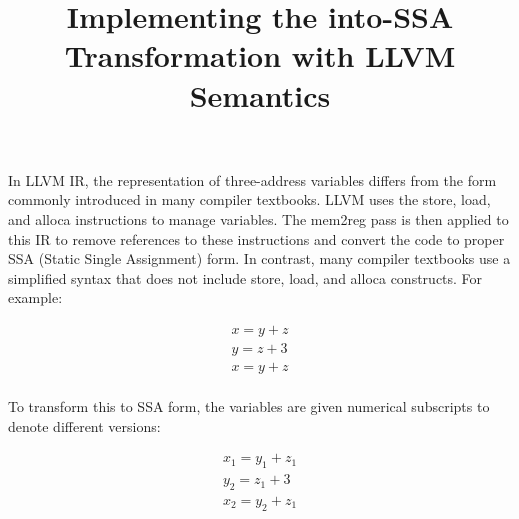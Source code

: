 \documentclass{article}
\title{Implementing the into-SSA Transformation with LLVM Semantics}
\author{}
\date{}
\begin{document}
\maketitle

In LLVM IR, the representation of three-address variables differs from the form
commonly introduced in many compiler textbooks. LLVM uses the store, load, and
alloca instructions to manage variables. The mem2reg pass is then applied to
this IR to remove references to these instructions and convert the code to
proper SSA (Static Single Assignment) form. In contrast, many compiler
textbooks use a simplified syntax that does not include store, load, and alloca
constructs. For example:

\begin{equation}
  \begin{split}
    x = y + z \\
    y = z + 3 \\
    x = y + z \\
  \end{split}
\end{equation}

To transform this to SSA form, the variables are given numerical subscripts to
denote different versions:

\begin{equation}
  \begin{split}
    x_1 = y_1 + z_1 \\
    y_2 = z_1 + 3   \\
    x_2 = y_2 + z_1 \\
  \end{split}
\end{equation}
\end{document}

